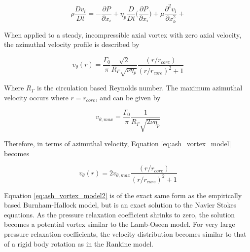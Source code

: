 \begin{equation}
\rho \frac{Dv_i}{Dt} = -\frac{\partial P}{\partial x_i} +
\eta_p \frac{D}{Dt} \Bigg( \frac{\partial P}{\partial x_i} \Bigg) + 
\mu \frac{\partial^2 v_i}{\partial x_{k}^2} + 
\label{eq:modified_ns4}
\end{equation}

When applied to a steady, incompressible axial vortex with zero axial velocity, 
the azimuthal velocity profile is described by

\begin{equation}
v_\theta(r) = \frac{\Gamma_0}{\pi} \frac{\sqrt{2}}{R_\Gamma \sqrt{\nu \eta_p}}
\frac{(r / r_{core})}{(r/r_{core})^2 + 1}
\label{eq:ash_vortex_model}
\end{equation}

\noindent
Where $R_\Gamma$ is the circulation based Reynolds number. The maximum 
azimuthal velocity occurs where $r = r_{core}$, and can be given by 

\begin{equation}
v_{\theta, max} = \frac{\Gamma_0}{\pi} \frac{1}{R_\Gamma \sqrt{2 \nu 
\eta_p}}
\label{eq:ash_vthetamax}
\end{equation}

\noindent
Therefore, in terms of azimuthal velocity, Equation \ref{eq:ash_vortex_model} 
becomes

\begin{equation}
v_\theta(r) = 2 v_{\theta, max}\frac{(r / r_{core})}{(r/r_{core})^2 + 1}
\label{eq:ash_vortex_model2}
\end{equation}

Equation \ref{eq:ash_vortex_model2} is of the exact same form as the 
empirically based Burnham-Hallock model, but is an exact solution to the Navier 
Stokes equations. As the pressure relaxation coefficient shrinks to zero, the 
solution becomes a potential vortex similar to the Lamb-Oseen model. For very 
large pressure relaxation coefficients, the velocity distribution becomes 
similar to that of a rigid body rotation as in the Rankine model.

